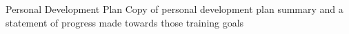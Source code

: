 \documentclass[a4paper, 12pt, twoside, openright, titlepage]{book}
\begin{document}
\begin{chapter}{Personal Development Plan}
Copy of personal development plan summary and a statement of progress made towards those training goals
\end{chapter}

\appendix
%
%
%

\backmatter

\end{document}
